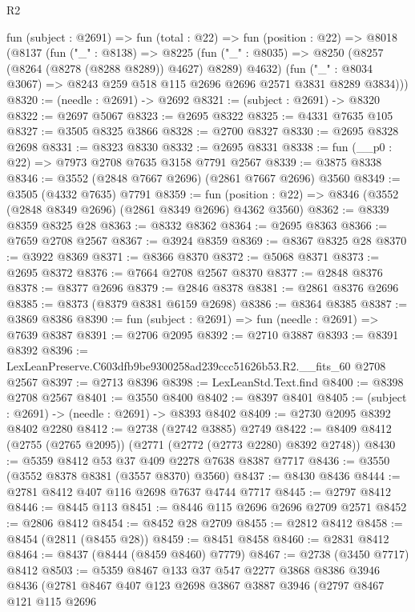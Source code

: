 \begin{lexlean}{R2}
\begin{coremodule}
  fun (subject : @2691) =>
  fun (total : @22) =>
  fun (position : @22) =>
  @8018
    (@8137
      (fun ("_" : @8138) =>
      @8225
        (fun ("_" : @8035) => @8250 (@8257 (@8264 (@8278 (@8288 @8289)) @4627) @8289) @4632)
        (fun ("_" : @8034 @3067) => @8243 @259 @518 @115 @2696 @2696 @2571 @3831 @8289 @3834)))
@8320 := (needle : @2691) -> @2692
@8321 := (subject : @2691) -> @8320
@8322 := @2697 @5067
@8323 := @2695 @8322
@8325 := @4331 @7635 @105
@8327 := @3505 @8325 @3866
@8328 := @2700 @8327
@8330 := @2695 @8328 @2698
@8331 := @8323 @8330
@8332 := @2695 @8331
@8338 := fun (__p0 : @22) => @7973 @2708 @7635 @3158 @7791 @2567
@8339 := @3875 @8338
@8346 := @3552 (@2848 @7667 @2696) (@2861 @7667 @2696) @3560
@8349 := @3505 (@4332 @7635) @7791
@8359 := fun (position : @22) => @8346 (@3552 (@2848 @8349 @2696) (@2861 @8349 @2696) @4362 @3560)
@8362 := @8339 @8359 @8325 @28
@8363 := @8332 @8362
@8364 := @2695 @8363
@8366 := @7659 @2708 @2567
@8367 := @3924 @8359
@8369 := @8367 @8325 @28
@8370 := @3922 @8369
@8371 := @8366 @8370
@8372 := @5068 @8371
@8373 := @2695 @8372
@8376 := @7664 @2708 @2567 @8370
@8377 := @2848 @8376
@8378 := @8377 @2696
@8379 := @2846 @8378
@8381 := @2861 @8376 @2696
@8385 := @8373 (@8379 @8381 @6159 @2698)
@8386 := @8364 @8385
@8387 := @3869 @8386
@8390 := fun (subject : @2691) => fun (needle : @2691) => @7639 @8387
@8391 := @2706 @2095
@8392 := @2710 @3887
@8393 := @8391 @8392
@8396 := LexLeanPreserve.C603dfb9be9300258ad239ccc51626b53.R2.__fits_60 @2708 @2567
@8397 := @2713 @8396
@8398 := LexLeanStd.Text.find
@8400 := @8398 @2708 @2567
@8401 := @3550 @8400
@8402 := @8397 @8401
@8405 := (subject : @2691) -> (needle : @2691) -> @8393 @8402
@8409 := @2730 @2095 @8392 @8402 @2280
@8412 := @2738 (@2742 @3885) @2749
@8422 := @8409 @8412 (@2755 (@2765 @2095)) (@2771 (@2772 (@2773 @2280) @8392 @2748))
@8430 := @5359 @8412 @53 @37 @409 @2278 @7638 @8387 @7717
@8436 := @3550 (@3552 @8378 @8381 (@3557 @8370) @3560)
@8437 := @8430 @8436
@8444 := @2781 @8412 @407 @116 @2698 @7637 @4744 @7717
@8445 := @2797 @8412
@8446 := @8445 @113
@8451 := @8446 @115 @2696 @2696 @2709 @2571
@8452 := @2806 @8412
@8454 := @8452 @28 @2709
@8455 := @2812 @8412
@8458 := @8454 (@2811 (@8455 @28))
@8459 := @8451 @8458
@8460 := @2831 @8412
@8464 := @8437 (@8444 (@8459 @8460) @7779)
@8467 := @2738 (@3450 @7717) @8412
@8503 := @5359
    @8467
    @133
    @37
    @547
    @2277
    @3868
    @8386
    @3946
    @8436
    (@2781
      @8467
      @407
      @123
      @2698
      @3867
      @3887
      @3946
      (@2797
        @8467
        @121
        @115
        @2696

\end{coremodule}
\end{lexlean}
